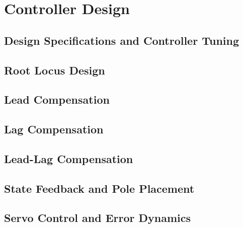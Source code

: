 \chapter{Controller Design} \label{ch:controller_design}

    \section{Design Specifications and Controller Tuning}

    \section{Root Locus Design}

    \section{Lead Compensation}

    \section{Lag Compensation}

    \section{Lead-Lag Compensation}

    \section{State Feedback and Pole Placement}

    \section{Servo Control and Error Dynamics}